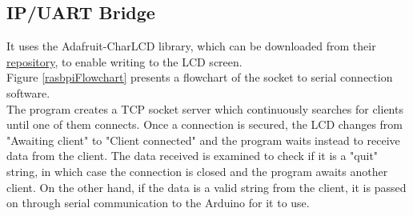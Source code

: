 
\subsection{IP/UART Bridge} 

It uses the Adafruit-CharLCD library, which can be downloaded from their \href{https://github.com/adafruit/Adafruit-Raspberry-Pi-Python-Code}{repository}, to enable writing to the LCD screen.\\

Figure \ref{rasbpiFlowchart} presents a flowchart of the socket to serial connection software.\\

The program creates a TCP socket server which continuously searches for clients until one of them connects. Once a connection is secured, the LCD changes from "Awaiting client" to "Client connected" and the program waits instead to receive data from the client. The data received is examined to check if it is a "quit" string, in which case the connection is closed and the program awaits another client. On the other hand, if the data is a valid string from the client, it is passed on through serial communication to the Arduino for it to use.

%

